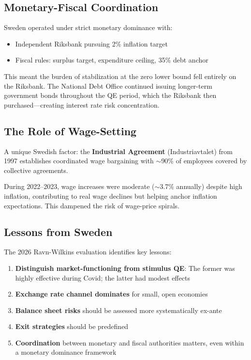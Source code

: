 \documentclass[11pt,a4paper]{article}
\begin{document}
\subsection{Monetary-Fiscal Coordination}

Sweden operated under strict monetary dominance with:
\begin{itemize}
    \item Independent Riksbank pursuing 2\% inflation target
    \item Fiscal rules: surplus target, expenditure ceiling, 35\% debt anchor
\end{itemize}

This meant the burden of stabilization at the zero lower bound fell entirely on the Riksbank. The National Debt Office continued issuing longer-term government bonds throughout the QE period, which the Riksbank then purchased---creating interest rate risk concentration.

\subsection{The Role of Wage-Setting}

A unique Swedish factor: the \textbf{Industrial Agreement} (Industriavtalet) from 1997 establishes coordinated wage bargaining with $\sim$90\% of employees covered by collective agreements.

During 2022--2023, wage increases were moderate ($\sim$3.7\% annually) despite high inflation, contributing to real wage declines but helping anchor inflation expectations. This dampened the risk of wage-price spirals.

\subsection{Lessons from Sweden}

The 2026 Ravn-Wilkins evaluation identifies key lessons:

\begin{enumerate}
    \item \textbf{Distinguish market-functioning from stimulus QE}: The former was highly effective during Covid; the latter had modest effects

    \item \textbf{Exchange rate channel dominates} for small, open economies

    \item \textbf{Balance sheet risks} should be assessed more systematically ex-ante

    \item \textbf{Exit strategies} should be predefined

    \item \textbf{Coordination} between monetary and fiscal authorities matters, even within a monetary dominance framework
\end{enumerate}
\end{document}
